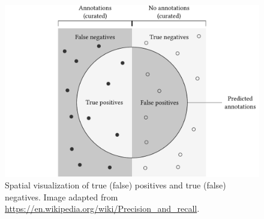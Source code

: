 \begin{figure}[!t]
\begin{center}
\includegraphics[width=\textwidth]{img/evaluation/v6/img.pdf}
\caption[Spatial visualization of true (false) positives and true (false) negatives.]{Spatial visualization of true (false) positives and true (false) negatives. Image adapted from \url{https://en.wikipedia.org/wiki/Precision_and_recall}.}
\label{fig:evaluation}
\end{center}
\end{figure}
